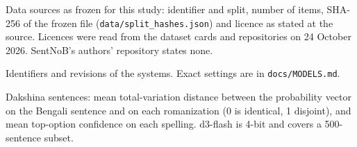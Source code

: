 \documentclass[11pt]{article}
\begin{document}
\begin{table}[h]
\centering\footnotesize

\caption{Data sources as frozen for this study: identifier and split, number of items, SHA-256 of the frozen file (\texttt{data/split\_hashes.json}) and licence as stated at the source. Licences were read from the dataset cards and repositories on 24 October 2026. SentNoB's authors' repository states none.}
\label{tab:prov}
\end{table}
\begin{table}[h]
\centering\footnotesize

\caption{Identifiers and revisions of the systems. Exact settings are in \texttt{docs/MODELS.md}.}
\label{tab:models}
\end{table}
\begin{table}[h]
\centering\footnotesize

\caption{Dakshina sentences: mean total-variation distance between the probability vector on the Bengali sentence and on each romanization (0 is identical, 1 disjoint), and mean top-option confidence on each spelling. d3-flash is 4-bit and covers a 500-sentence subset.}
\label{tab:daktv}
\end{table}
\end{document}
